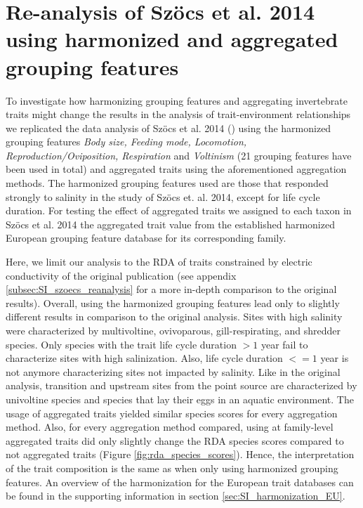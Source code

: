 \documentclass[../Draft_harmonization_paper.tex]{subfiles}
\begin{document}


\section{Re-analysis of Szöcs et al. 2014 using harmonized and aggregated grouping features}

To investigate how harmonizing grouping features and aggregating invertebrate traits might change the results in the analysis of trait-environment relationships we replicated the data analysis of Szöcs et al. 2014 (\cite{szocs_effects_2014}) using the harmonized grouping features \textit{Body size, Feeding mode, Locomotion, Reproduction/Oviposition, Respiration} and \textit{Voltinism} (21 grouping features have been used in total) and aggregated traits using the aforementioned aggregation methods. The harmonized grouping features used are those that responded strongly to salinity in the study of Szöcs et. al. 2014, except for life cycle duration. %
For testing the effect of aggregated traits we assigned to each taxon in Szöcs et al. 2014 the aggregated trait value from the established harmonized European grouping feature database for its corresponding family.

Here, we limit our analysis to the RDA of traits constrained by electric conductivity of the original publication (see appendix \ref{subsec:SI_szoecs_reanalysis} for a more in-depth comparison to the original results). Overall, using the harmonized grouping features lead only to slightly different results in comparison to the original analysis. Sites with high salinity were characterized by multivoltine, ovivoparous, gill-respirating, and shredder species. Only species with the trait life cycle duration $> 1$ year fail to characterize sites with high salinization. Also, life cycle duration $<= 1$ year is not anymore characterizing sites not impacted by salinity. Like in the original analysis, transition and upstream sites from the point source are characterized by univoltine species and species that lay their eggs in an aquatic environment. The usage of aggregated traits yielded similar species scores for every aggregation method. Also, for every aggregation method compared, using at family-level aggregated traits did only slightly change the RDA species scores compared to not aggregated traits (Figure \ref{fig:rda_species_scores}). Hence, the interpretation of the trait composition is the same as when only using harmonized grouping features. An overview of the harmonization for the European trait databases can be found in the supporting information in section \ref{sec:SI_harmonization_EU}.
\end{document}
